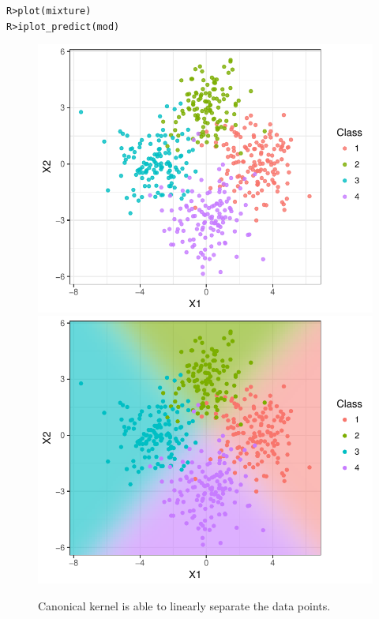 \documentclass[a4paper,showframe,11pt]{report}\usepackage[]{graphicx}\usepackage[]{color}
\makeatletter
\newcommand{\hlstd}[1]{\textcolor[rgb]{0.196,0.196,0.196}{#1}}%
\newcommand{\hlkwd}[1]{\textcolor[rgb]{0.78,0.227,0.412}{#1}}%
\newenvironment{kframe}{%
 \def\at@end@of@kframe{}%
 \ifinner\ifhmode%
  \def\at@end@of@kframe{\end{minipage}}%
  \begin{minipage}{\columnwidth}%
 \fi\fi%
 \def\FrameCommand##1{\hskip\@totalleftmargin \hskip-\fboxsep
 \colorbox{shadecolor}{##1}\hskip-\fboxsep
     \hskip-\linewidth \hskip-\@totalleftmargin \hskip\columnwidth}%
 \MakeFramed {\advance\hsize-\width
   \@totalleftmargin\z@ \linewidth\hsize
   \@setminipage}}%
 {\par\unskip\endMakeFramed%
 \at@end@of@kframe}
\newenvironment{knitrout}{}{} %
\makeatother
\begin{document}
\begin{knitrout}
\color{fgcolor}\begin{kframe}
\begin{alltt}
\hlstd{R> }\hlkwd{plot}\hlstd{(mixture)}
\hlstd{R> }\hlkwd{iplot_predict}\hlstd{(mod)}
\end{alltt}
\end{kframe}\begin{figure}[h]

{\centering \includegraphics[width=0.49\linewidth]{figure/mixture_mod_plot-1} 
\includegraphics[width=0.49\linewidth]{figure/mixture_mod_plot-2} 

}

\caption[Canonical kernel is able to linearly separate the data points]{Canonical kernel is able to linearly separate the data points.}\label{fig:mixture_mod_plot}
\end{figure}


\end{knitrout}
\end{document}
